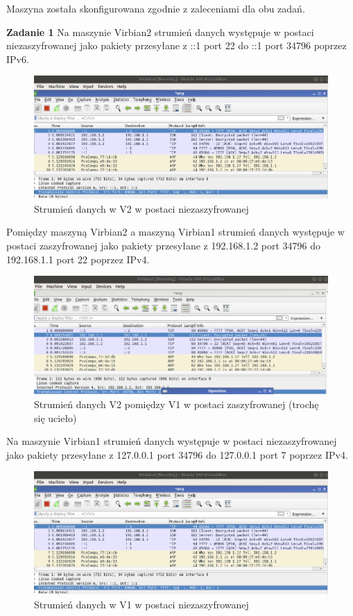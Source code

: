 \documentclass[12pt,a4paper]{article}
\newcommand{\zadanie}[1]{\par\textbf{Zadanie #1}}
\begin{document}
Maszyna została skonfigurowana zgodnie z zaleceniami dla obu zadań.

\zadanie{1}
Na maszynie Virbian2 strumień danych występuje w postaci niezaszyfrowanej jako
pakiety przesyłane z ::1 port 22 do ::1 port 34796 poprzez IPv6.
\begin{figure}[!htb]
\centering
\includegraphics[scale=0.3]{a.png}
\caption{Strumień danych w V2 w postaci niezaszyfrowanej}
\end{figure}

Pomiędzy maszyną Virbian2 a maszyną Virbian1 strumień danych występuje w postaci zaszyfrowanej jako pakiety przesyłane z 192.168.1.2 port 34796 do 192.168.1.1 port 22 poprzez IPv4.

\begin{figure}[!htb]
\centering
\includegraphics[scale=0.3]{b.png}
\caption{Strumień danych V2 pomiędzy V1 w postaci zaszyfrowanej (trochę się ucieło)}
\end{figure}

Na maszynie Virbian1 strumień danych występuje w postaci niezaszyfrowanej jako
pakiety przesyłane z 127.0.0.1 port 34796 do 127.0.0.1 port 7 poprzez IPv4.
\begin{figure}[!htb]
\centering
\includegraphics[scale=0.3]{a.png}
\caption{Strumień danych w V1 w postaci niezaszyfrowanej}
\end{figure}
\end{document}
